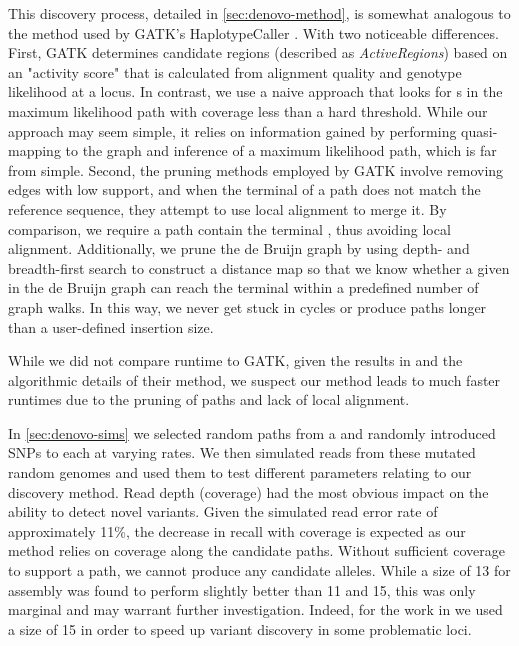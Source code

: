 This \denovo{} discovery process, detailed in \autoref{sec:denovo-method}, is somewhat analogous to the method used by GATK's HaplotypeCaller \cite{Poplin2018}. With two noticeable differences. First, GATK determines candidate regions (described as \emph{ActiveRegions}) based on an "activity score" that is calculated from alignment quality and genotype likelihood at a locus. In contrast, we use a naive approach that looks for \kmer{}s in the maximum likelihood path with coverage less than a hard threshold. While our approach may seem simple, it relies on information gained by performing quasi-mapping to the graph and inference of a maximum likelihood path, which is far from simple. Second, the pruning methods employed by GATK involve removing edges with low support, and when the terminal \kmer{} of a path does not match the reference sequence, they attempt to use local alignment to merge it. By comparison, we require a path contain the terminal \kmer{}, thus avoiding local alignment. Additionally, we prune the de Bruijn graph by using depth- and breadth-first search to construct a distance map so that we know whether a given \kmer{} in the de Bruijn graph can reach the terminal \kmer{} within a predefined number of graph walks. In this way, we never get stuck in cycles or produce paths longer than a user-defined insertion size. 

While we did not compare \pandora{} runtime to GATK, given the results in \cite{Poplin2018} and the algorithmic details of their method, we suspect our method leads to much faster runtimes due to the pruning of paths and lack of local alignment.

\noindent
In \autoref{sec:denovo-sims} we selected random paths from a \panrg{} and randomly introduced SNPs to each at varying rates. We then simulated \ont{} reads from these mutated random genomes and used them to test different parameters relating to our \denovo{} discovery method. Read depth (coverage) had the most obvious impact on the ability to detect novel variants. Given the simulated \ont{} read error rate of approximately 11\%, the decrease in recall with coverage is expected as our method relies on \kmer{} coverage along the candidate paths. Without sufficient \kmer{} coverage to support a path, we cannot produce any candidate alleles. While a \kmer{} size of 13 for \denovo{} assembly was found to perform slightly better than 11 and 15, this was only marginal and may warrant further investigation. Indeed, for the work in \cite{pandora} we used a \denovo{} \kmer{} size of 15 in order to speed up variant discovery in some problematic loci.

